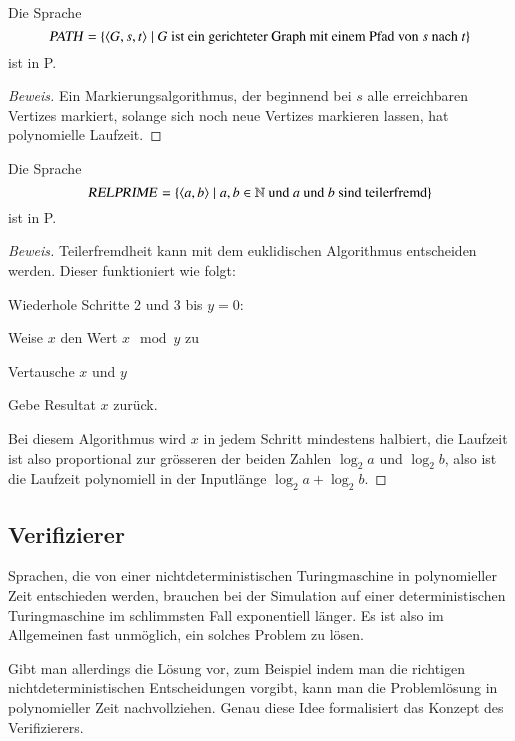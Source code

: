 \begin{satz}
%
Die Sprache
\[
\text{\textsl{PATH}}
=\{
\langle G,s,t\rangle
\;|\;\text{$G$ ist ein gerichteter Graph mit einem Pfad von $s$ nach $t$}
\}
\]
ist in P.
\end{satz}

\begin{proof}[Beweis]
%
Ein Markierungsalgorithmus, der beginnend bei $s$ alle erreichbaren
Vertizes markiert, solange sich noch neue Vertizes markieren lassen,
hat polynomielle Laufzeit.
\end{proof}

\begin{satz}
%
Die Sprache
\[
\text{\textsl{RELPRIME}}
=\{
\langle a,b\rangle \;|\;
\text{$a, b\in \mathbb N$ und $a$ und $b$ sind teilerfremd}
\}
\]
ist in P.
\end{satz}

\begin{proof}[Beweis]
%
Teilerfremdheit kann mit dem euklidischen Algorithmus entscheiden werden.
Dieser funktioniert wie folgt:
\begin{compactenum}
\item Wiederhole Schritte 2 und 3 bis $y=0$:
\item Weise $x$ den Wert $x\mod y$ zu
\item Vertausche $x$ und $y$
\item Gebe Resultat $x$ zurück.
\end{compactenum}
Bei diesem Algorithmus wird $x$ in jedem Schritt mindestens halbiert,
die Laufzeit ist also proportional zur grösseren der
beiden Zahlen $\log_2 a$ und $\log_2 b$, also ist die Laufzeit
polynomiell in der Inputlänge $\log_2 a+\log_2 b$.
\end{proof}

\subsection{Verifizierer}
Sprachen, die von einer nichtdeterministischen Turingmaschine
in polynomieller Zeit entschieden werden, brauchen bei der
Simulation auf einer deterministischen Turingmaschine im
schlimmsten Fall exponentiell länger.
Es ist also im
Allgemeinen fast unmöglich, ein solches Problem zu lösen.

Gibt man allerdings die Lösung vor, zum Beispiel indem man
die richtigen nichtdeterministischen Entscheidungen vorgibt,
kann man die Problemlösung in polynomieller Zeit nachvollziehen.
Genau diese Idee formalisiert das Konzept des Verifizierers.

